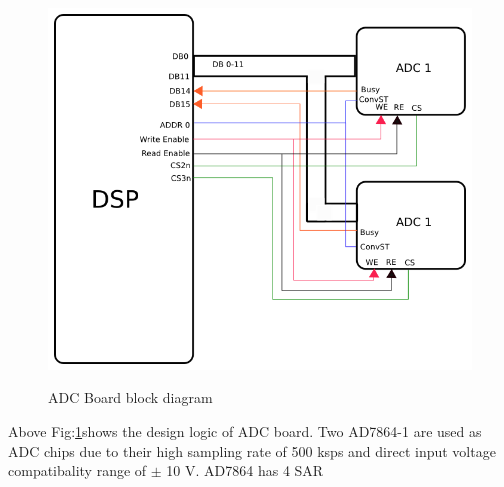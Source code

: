 \begin{figure}[ht]
\includegraphics[width=\columnwidth]{fig/ADC_board.png}
\label{fig:adc_board}
\caption{ADC Board block diagram}
\end{figure}
Above Fig:\ref{fig:adc_board}shows the design logic of ADC board. Two AD7864-1 are used as ADC chips due to their high sampling rate of 500 ksps and direct input voltage compatibality range of $\pm$ 10 V. AD7864 has 4 SAR 
